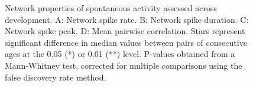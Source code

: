 \documentclass{article}
\begin{document}
\begin{figure}
  \centering
  \caption{Network properties of spontaneous activity assessed
    across development.  A: Network spike rate.  B: Network spike
    duration.  C: Network spike peak. D: Mean pairwise correlation. Stars represent significant difference in median values between pairs of consecutive ages at the 0.05 (*) or 0.01 (**) level. P-values obtained from a Mann-Whitney test, corrected for multiple comparisons using the false discovery rate method.}
\end{figure}
\end{document}
